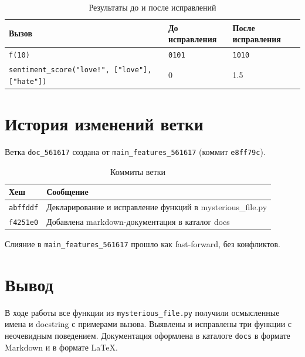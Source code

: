 \documentclass[a4paper,12pt]{article}
\begin{document}
\begin{table}[h]
\centering
\begin{tabular}{|l|l|l|}
\hline
Вызов & До исправления & После исправления \\ \hline
\texttt{f(10)} & \texttt{0101} & \texttt{1010} \\ \hline
\texttt{sentiment\_score("love!", ["love"], ["hate"])} & 0 & 1.5 \\ \hline
\end{tabular}
\caption{Результаты до и после исправлений}
\label{tab:results}
\end{table}

\section{История изменений ветки}

Ветка \texttt{doc\_561617} создана от \texttt{main\_features\_561617} (коммит \texttt{e8ff79c}).

\begin{table}[h]
\centering
\begin{tabular}{|l|p{9cm}|}
\hline
Хеш & Сообщение \\ \hline
\texttt{abffddf} & Декларирование и исправление функций в mysterious\_file.py \\ \hline
\texttt{f4251e0} & Добавлена markdown-документация в каталог docs \\ \hline
\end{tabular}
\caption{Коммиты ветки}
\label{tab:commits}
\end{table}

Слияние в \texttt{main\_features\_561617} прошло как fast-forward, без конфликтов.

\section{Вывод}

В ходе работы все функции из \texttt{mysterious\_file.py} получили осмысленные имена и docstring с примерами вызова. Выявлены и исправлены три функции с неочевидным поведением. Документация оформлена в каталоге \texttt{docs} в формате Markdown и в формате \LaTeX{}.
\end{document}
